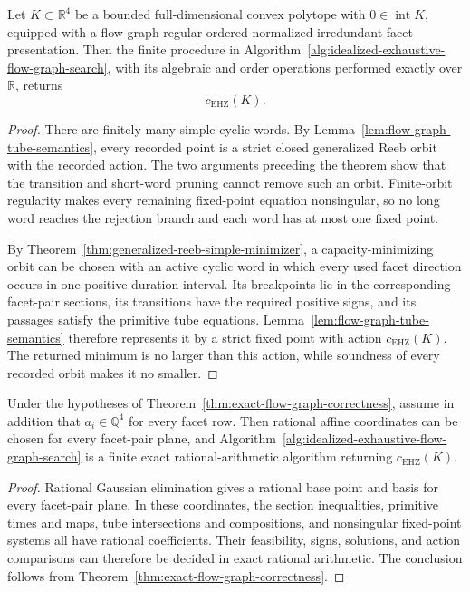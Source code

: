 \begin{theorem}
\label{thm:exact-flow-graph-correctness}
Let \(K\subset\mathbb R^4\) be a bounded full-dimensional convex polytope
with \(0\in\operatorname{int}K\), equipped with a flow-graph regular ordered
normalized irredundant facet presentation.  Then the finite procedure in
Algorithm~\ref{alg:idealized-exhaustive-flow-graph-search}, with its algebraic
and order operations performed exactly over \(\mathbb R\), returns
\[
  c_{\mathrm{EHZ}}(K).
\]
\end{theorem}

\begin{proof}
There are finitely many simple cyclic words.  By
Lemma~\ref{lem:flow-graph-tube-semantics}, every recorded point is a strict
closed generalized Reeb orbit with the recorded action.  The two arguments
preceding the theorem show that the transition and short-word pruning cannot
remove such an orbit.  Finite-orbit regularity makes every remaining
fixed-point equation nonsingular, so no long word reaches the rejection
branch and each word has at most one fixed point.

By Theorem~\ref{thm:generalized-reeb-simple-minimizer}, a capacity-minimizing
orbit can be chosen with an active cyclic word in which every used facet
direction occurs in one positive-duration interval.  Its breakpoints lie in
the corresponding facet-pair sections, its transitions have the required
positive signs, and its passages satisfy the primitive tube equations.
Lemma~\ref{lem:flow-graph-tube-semantics} therefore represents it by a strict
fixed point with action \(c_{\mathrm{EHZ}}(K)\).  The returned minimum is no
larger than this action, while soundness of every recorded orbit makes it no
smaller.
\end{proof}

\begin{corollary}
\label{cor:rational-flow-graph-correctness}
Under the hypotheses of
Theorem~\ref{thm:exact-flow-graph-correctness}, assume in addition that
\(a_i\in\mathbb Q^4\) for every facet row.  Then rational affine coordinates
can be chosen for every facet-pair plane, and
Algorithm~\ref{alg:idealized-exhaustive-flow-graph-search} is a finite exact
rational-arithmetic algorithm returning \(c_{\mathrm{EHZ}}(K)\).
\end{corollary}

\begin{proof}
Rational Gaussian elimination gives a rational base point and basis for every
facet-pair plane.  In these coordinates, the section inequalities, primitive
times and maps, tube intersections and compositions, and nonsingular
fixed-point systems all have rational coefficients.  Their feasibility, signs,
solutions, and action comparisons can therefore be decided in exact rational
arithmetic.  The conclusion follows from
Theorem~\ref{thm:exact-flow-graph-correctness}.
\end{proof}

